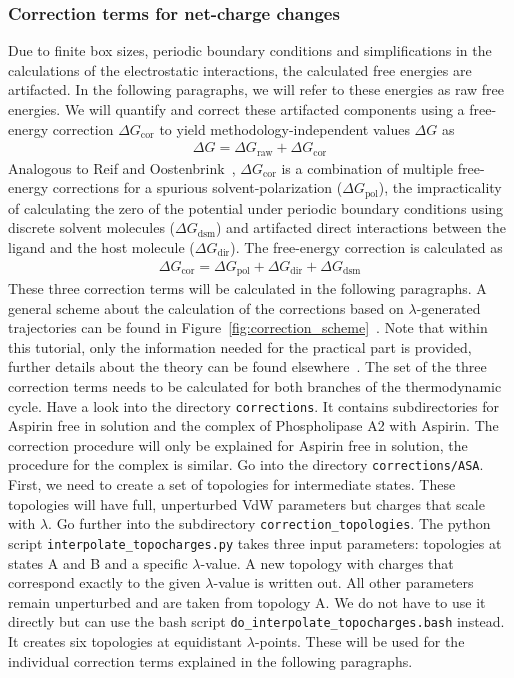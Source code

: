\subsubsection{Correction terms for net-charge changes}
Due to finite box sizes, periodic boundary conditions and
simplifications in the calculations of the electrostatic interactions,
the calculated free energies are artifacted. In the following
paragraphs, we will refer to these energies as raw free energies. We
will quantify and correct these artifacted components using a
free-energy correction $\Delta G_{\text{cor}}$ to yield methodology-independent
values $\Delta G$ as
\begin{align}
    \Delta G = \Delta G_{\text{raw}} + \Delta G_{\text{cor}}
\end{align}
%
Analogous to Reif and Oostenbrink~\cite{Reif2014}, $\Delta G_{\text{cor}}$ is a
combination of multiple free-energy corrections for a spurious
solvent-polarization ($\Delta G_{\text{pol}}$), the impracticality
of
calculating the zero of the potential under periodic boundary
conditions using discrete solvent molecules ($\Delta G_{\text{dsm}}$) and
artifacted direct interactions between the ligand and the host
molecule ($\Delta G_{\text{dir}}$). The free-energy correction is calculated
as
\begin{align} \label{equ:corrected_free_energy}
  \Delta G_{\text{cor}} = \Delta G_{\text{pol}} + \Delta G_{\text{dir}} + \Delta G_{\text{dsm}}
\end{align}
%
These three correction terms will be calculated in the following
paragraphs. A general scheme about the calculation of the corrections
based on $\lambda$-generated trajectories can be found in
Figure~\ref{fig:correction_scheme}~\cite{Ohlknecht2020}. 
Note that within this tutorial, only the information needed for the
practical part is provided, further details about the theory can be
found elsewhere~\cite{ReifBook2011,Kastenholz2006_I,Reif2014}. The set
of the three correction terms needs to be calculated for both branches of
the thermodynamic cycle. Have a look into the directory
\texttt{corrections}. It contains subdirectories for Aspirin free in
solution and the complex of Phospholipase A2 with Aspirin. The
correction procedure will only be explained for Aspirin free in
solution, the procedure for the complex is similar. Go into the
directory \texttt{corrections/ASA}. First, we need to create a set of
topologies for intermediate states. These topologies will have full,
unperturbed VdW parameters but charges that scale with $\lambda$.  Go
further into the subdirectory \texttt{correction\_topologies}. The
python script \texttt{interpolate\_topocharges.py} takes three input
parameters: topologies at states A and B and a specific
$\lambda$-value. A new topology with charges that correspond exactly
to the given $\lambda$-value is written out. All other parameters
remain unperturbed and are taken from topology A. We do not have to use
it directly but can use the bash script
\texttt{do\_interpolate\_topocharges.bash} instead. It creates six
topologies at equidistant $\lambda$-points. These will be used for the
individual correction terms explained in the following paragraphs.

